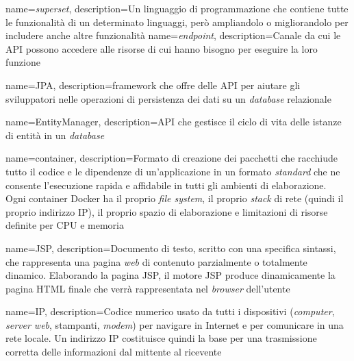 
{
    name=\textit{superset},
    description={Un linguaggio di programmazione che contiene tutte le
            funzionalità di un determinato linguaggi, però ampliandolo o migliorandolo per
            includere anche altre funzionalità}
}
{
    name=\textit{endpoint},
    description={Canale da cui le \gls{API} possono accedere alle risorse di
            cui hanno bisogno per eseguire la loro funzione}
}

{
    name=JPA,
    description={\Gls{framework} che offre delle \gls{API} per aiutare gli
            sviluppatori nelle operazioni di persistenza dei dati su un \textit{database}
            relazionale}
}

{
    name=EntityManager,
    description={API che gestisce il ciclo di vita delle istanze di entità in
            un \textit{database}}
}

{
    name=container,
    description={Formato di creazione dei pacchetti che racchiude tutto il
            codice e le dipendenze di un'applicazione in un formato \textit{standard} che
            ne consente l'esecuzione rapida e affidabile in tutti gli ambienti di
            elaborazione.\\ Ogni container Docker ha il proprio \textit{file system}, il
            proprio \textit{stack} di rete (quindi il proprio indirizzo \gls{IP}), il
            proprio spazio di elaborazione e limitazioni di risorse definite per CPU e
            memoria}
}

{
    name=JSP,
    description={Documento di testo, scritto con una specifica sintassi, che
            rappresenta una pagina \textit{web} di contenuto parzialmente o totalmente
            dinamico. Elaborando la pagina JSP, il motore JSP produce dinamicamente la
            pagina HTML finale che verrà rappresentata nel \textit{browser} dell'utente}
}

{
    name=IP,
    description={Codice numerico usato da tutti i dispositivi
            (\textit{computer}, \textit{server web}, stampanti, \textit{modem}) per
            navigare in Internet e per comunicare in una rete locale. Un indirizzo IP
            costituisce quindi la base per una trasmissione corretta delle informazioni dal
            mittente al ricevente}
}

